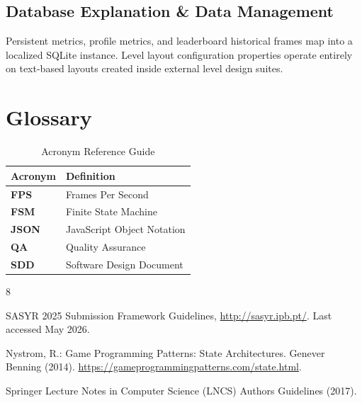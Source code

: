 \documentclass[runningheads]{llncs}
\begin{document}
\subsection{Database Explanation \& Data Management}
Persistent metrics, profile metrics, and leaderboard historical frames map into a localized SQLite instance. Level layout configuration properties operate entirely on text-based layouts created inside external level design suites.


\section{Glossary}
\begin{table}[h]
\centering
\caption{Acronym Reference Guide}
\label{tab:glossary}
\begin{tabular}{|l|l|}
\hline
\textbf{Acronym} & \textbf{Definition} \\ \hline
\textbf{FPS}     & Frames Per Second \\ \hline
\textbf{FSM}     & Finite State Machine \\ \hline
\textbf{JSON}    & JavaScript Object Notation \\ \hline
\textbf{QA}      & Quality Assurance \\ \hline
\textbf{SDD}     & Software Design Document \\ \hline
\end{tabular}
\end{table}


\begin{thebibliography}{8}

SASYR 2025 Submission Framework Guidelines, \url{http://sasyr.ipb.pt/}. Last accessed May 2026.

Nystrom, R.: Game Programming Patterns: State Architectures. Genever Benning (2014). \url{https://gameprogrammingpatterns.com/state.html}.

Springer Lecture Notes in Computer Science (LNCS) Authors Guidelines (2017).

\end{thebibliography}
\end{document}
